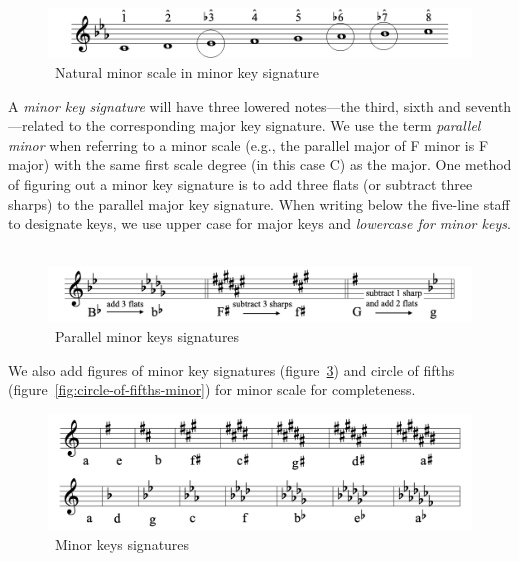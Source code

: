 \begin{figure}
    \centering
    \includegraphics[width=\textwidth]{assets/natural-in-minor}
    \caption{~Natural minor scale in minor key signature~\cite{music-theory}}\label{fig:natural-in-minor}
\end{figure}


A \textit{minor key signature} will have three lowered notes—the third, sixth and seventh—related to the corresponding major key signature.
We use the term \textit{parallel minor} when referring to a minor scale (e.g., the parallel major of F minor is F major) with the same first scale degree (in this case C) as the major.
One method of figuring out a minor key signature is to add three flats (or subtract three sharps) to the parallel major key signature.
When writing below the five-line staff to designate keys, we use upper case for major keys and \textit{lowercase for minor keys}.
~\cite{music-theory}


\begin{figure}
    \centering
    \includegraphics[width=\textwidth]{assets/parallel-minors}
    \caption{~Parallel minor keys signatures~\cite{music-theory}}\label{fig:parallel-minors}
\end{figure}

We also add figures of minor key signatures (figure~\ref{fig:minor-key-signatures}) and circle of fifths (figure~\ref{fig:circle-of-fifths-minor}) for minor scale for completeness.


\begin{figure}
    \centering
    \includegraphics[width=\textwidth]{assets/minor-key-signatures}
    \caption{~Minor keys signatures~\cite{music-theory}}\label{fig:minor-key-signatures}
\end{figure}



